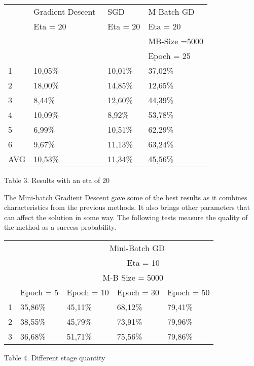 \documentclass[a4paper, 12pt]{amsart}
\begin{document}
\centering
\begin{tabular}{l|lll}
~       & Gradient Descent~ & SGD     & M-Batch GD  \\ 
        &   Eta = 20        &   Eta = 20& Eta = 20        \\
        &                   &         & MB-Size =5000        \\
        &                   &         & Epoch = 25          \\
\hline
1       & 10,05\%           & 10,01\% & 37,02\%      \\
2       & 18,00\%           & 14,85\% & 12,65\%     \\
3       & 8,44\%            & 12,60\% & 44,39\%     \\
4       & 10,09\%           & 8,92\% & 53,78\%     \\
5       & 6,99\%            & 10,51\% & 62,29\%     \\
6       & 9,67\%            & 11,13\% & 63,24\%     \\
AVG     & 10,53\%           & 11,34\% & 45,56\%    
\end{tabular}
\begin{center}
Table 3. Results with an eta of 20
\end{center}
\begin{flushleft}
\justify
The Mini-batch Gradient Descent gave some of the best results as it combines 
characteristics from the previous methods. It also brings other parameters that can affect the solution in some way. The following tests measure the 
quality of the method as a success probability.
\end{flushleft}
\clearpage

\centering
\begin{tabular}{l|llll}
\multicolumn{5}{l}{~ ~ ~ ~ ~ ~ ~ ~ ~ ~ ~ ~ ~ ~ ~ Mini-Batch GD}     \\
\multicolumn{5}{l}{~ ~ ~ ~ ~ ~ ~ ~ ~ ~ ~ ~ ~ ~ ~ ~ ~ ~Eta = 10}     \\
\multicolumn{5}{l}{~ ~ ~ ~ ~ ~ ~ ~ ~ ~ ~ ~ ~ ~ M-B Size = 5000}    \\
  & Epoch = 5 & Epoch = 10 & Epoch = 30 & Epoch = 50                \\ 
\hline
1 & 35,86\%   & 45,11\%    & 68,12\%    & 79,41\%                   \\
2 & 38,55\%   & 45,79\%    & 73,91\%    & 79,96\%                   \\
3 & 36,68\%   & 51,71\%    & 75,56\%    & 79,86\%                  
\end{tabular}
\begin{center}
Table 4. Different stage quantity
\end{center}
\end{document}
